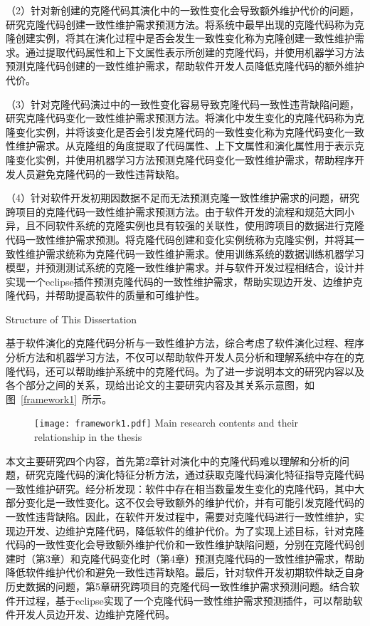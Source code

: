 （2）针对新创建的克隆代码其演化中的一致性变化会导致额外维护代价的问题，研究克隆代码创建一致性维护需求预测方法。将系统中最早出现的克隆代码称为克隆创建实例，将其在演化过程中是否会发生一致性变化称为克隆创建一致性维护需求。通过提取代码属性和上下文属性表示所创建的克隆代码，并使用机器学习方法预测克隆代码创建的一致性维护需求，帮助软件开发人员降低克隆代码的额外维护代价。

（3）针对克隆代码演过中的一致性变化容易导致克隆代码一致性违背缺陷问题，研究克隆代码变化一致性维护需求预测方法。将演化中发生变化的克隆代码称为克隆变化实例，并将该变化是否会引发克隆代码的一致性变化称为克隆代码变化一致性维护需求。从克隆组的角度提取了代码属性、上下文属性和演化属性用于表示克隆变化实例，并使用机器学习方法预测克隆代码变化一致性维护需求，帮助程序开发人员避免克隆代码的一致性违背缺陷。

（4）针对软件开发初期因数据不足而无法预测克隆一致性维护需求的问题，研究跨项目的克隆代码一致性维护需求预测方法。由于软件开发的流程和规范大同小异，且不同软件系统的克隆实例也具有较强的关联性，使用跨项目的数据进行克隆代码一致性维护需求预测。将克隆代码创建和变化实例统称为克隆实例，并将其一致性维护需求统称为克隆代码一致性维护需求。使用训练系统的数据训练机器学习模型，并预测测试系统的克隆一致性维护需求。并与软件开发过程相结合，设计并实现一个eclipse插件预测克隆代码的一致性维护需求，帮助实现边开发、边维护克隆代码，并帮助提高软件的质量和可维护性。

{Structure of This Dissertation}

基于软件演化的克隆代码分析与一致性维护方法，综合考虑了软件演化过程、程序分析方法和机器学习方法，不仅可以帮助软件开发人员分析和理解系统中存在的克隆代码，还可以帮助维护系统中的克隆代码。为了进一步说明本文的研究内容以及各个部分之间的关系，现给出论文的主要研究内容及其关系示意图，如图~\ref{framework1}~所示。

\begin{figure}[htbp]
\centering
\texttt{[image: framework1.pdf]}
{Main research contents and their relationship in the thesis}
\vspace{-1em}
\end{figure}

本文主要研究四个内容，首先第2章针对演化中的克隆代码难以理解和分析的问题，研究克隆代码的演化特征分析方法，通过获取克隆代码演化特征指导克隆代码一致性维护研究。经分析发现：软件中存在相当数量发生变化的克隆代码，其中大部分变化是一致性变化。这不仅会导致额外的维护代价，并有可能引发克隆代码的一致性违背缺陷。因此，在软件开发过程中，需要对克隆代码进行一致性维护，实现边开发、边维护克隆代码，降低软件的维护代价。为了实现上述目标，针对克隆代码的一致性变化会导致额外维护代价和一致性维护缺陷问题，分别在克隆代码创建时（第3章）和克隆代码变化时（第4章）预测克隆代码的一致性维护需求，帮助降低软件维护代价和避免一致性违背缺陷。最后，针对软件开发初期软件缺乏自身历史数据的问题，第5章研究跨项目的克隆代码一致性维护需求预测问题。结合软件开过程，基于eclipse实现了一个克隆代码一致性维护需求预测插件，可以帮助软件开发人员边开发、边维护克隆代码。

